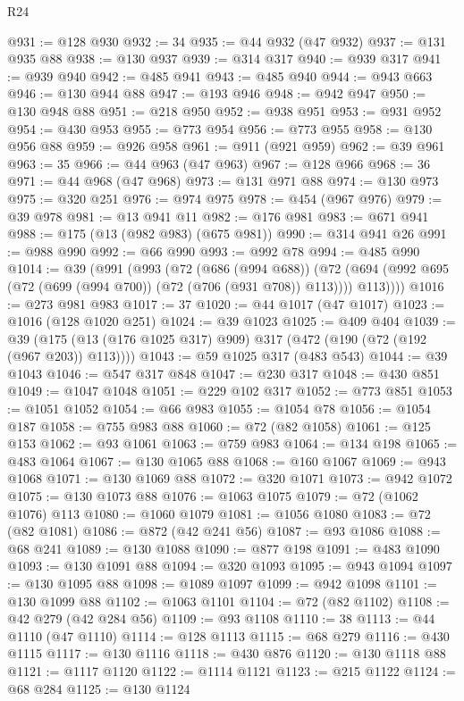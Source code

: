 \begin{lexlean}{R24}
\begin{coremodule}
@931 := @128 @930
@932 := 34
@935 := @44 @932 (@47 @932)
@937 := @131 @935 @88
@938 := @130 @937
@939 := @314 @317
@940 := @939 @317
@941 := @939 @940
@942 := @485 @941
@943 := @485 @940
@944 := @943 @663
@946 := @130 @944 @88
@947 := @193 @946
@948 := @942 @947
@950 := @130 @948 @88
@951 := @218 @950
@952 := @938 @951
@953 := @931 @952
@954 := @430 @953
@955 := @773 @954
@956 := @773 @955
@958 := @130 @956 @88
@959 := @926 @958
@961 := @911 (@921 @959)
@962 := @39 @961
@963 := 35
@966 := @44 @963 (@47 @963)
@967 := @128 @966
@968 := 36
@971 := @44 @968 (@47 @968)
@973 := @131 @971 @88
@974 := @130 @973
@975 := @320 @251
@976 := @974 @975
@978 := @454 (@967 @976)
@979 := @39 @978
@981 := @13 @941 @11
@982 := @176 @981
@983 := @671 @941
@988 := @175 (@13 (@982 @983) (@675 @981))
@990 := @314 @941 @26
@991 := @988 @990
@992 := @66 @990
@993 := @992 @78
@994 := @485 @990
@1014 := @39
    (@991
      (@993
        (@72
          (@686 (@994 @688))
          (@72 (@694 (@992 @695 (@72 (@699 (@994 @700)) (@72 (@706 (@931 @708)) @113)))) @113))))
@1016 := @273 @981 @983
@1017 := 37
@1020 := @44 @1017 (@47 @1017)
@1023 := @1016 (@128 @1020 @251)
@1024 := @39 @1023
@1025 := @409 @404
@1039 := @39 (@175 (@13 (@176 @1025 @317) @909) @317 (@472 (@190 (@72 (@192 (@967 @203)) @113))))
@1043 := @59 @1025 @317 (@483 @543)
@1044 := @39 @1043
@1046 := @547 @317 @848
@1047 := @230 @317
@1048 := @430 @851
@1049 := @1047 @1048
@1051 := @229 @102 @317
@1052 := @773 @851
@1053 := @1051 @1052
@1054 := @66 @983
@1055 := @1054 @78
@1056 := @1054 @187
@1058 := @755 @983 @88
@1060 := @72 (@82 @1058)
@1061 := @125 @153
@1062 := @93 @1061
@1063 := @759 @983
@1064 := @134 @198
@1065 := @483 @1064
@1067 := @130 @1065 @88
@1068 := @160 @1067
@1069 := @943 @1068
@1071 := @130 @1069 @88
@1072 := @320 @1071
@1073 := @942 @1072
@1075 := @130 @1073 @88
@1076 := @1063 @1075
@1079 := @72 (@1062 @1076) @113
@1080 := @1060 @1079
@1081 := @1056 @1080
@1083 := @72 (@82 @1081)
@1086 := @872 (@42 @241 @56)
@1087 := @93 @1086
@1088 := @68 @241
@1089 := @130 @1088
@1090 := @877 @198
@1091 := @483 @1090
@1093 := @130 @1091 @88
@1094 := @320 @1093
@1095 := @943 @1094
@1097 := @130 @1095 @88
@1098 := @1089 @1097
@1099 := @942 @1098
@1101 := @130 @1099 @88
@1102 := @1063 @1101
@1104 := @72 (@82 @1102)
@1108 := @42 @279 (@42 @284 @56)
@1109 := @93 @1108
@1110 := 38
@1113 := @44 @1110 (@47 @1110)
@1114 := @128 @1113
@1115 := @68 @279
@1116 := @430 @1115
@1117 := @130 @1116
@1118 := @430 @876
@1120 := @130 @1118 @88
@1121 := @1117 @1120
@1122 := @1114 @1121
@1123 := @215 @1122
@1124 := @68 @284
@1125 := @130 @1124

\end{coremodule}
\end{lexlean}
